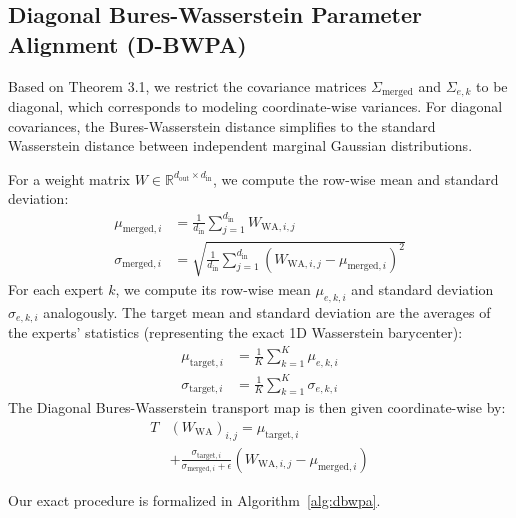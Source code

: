 \documentclass{article}
\theoremstyle{plain}
\theoremstyle{definition}
\theoremstyle{remark}
\begin{document}
\subsection{Diagonal Bures-Wasserstein Parameter Alignment (D-BWPA)}
Based on Theorem 3.1, we restrict the covariance matrices $\Sigma_{\text{merged}}$ and $\Sigma_{e, k}$ to be diagonal, which corresponds to modeling coordinate-wise variances. For diagonal covariances, the Bures-Wasserstein distance simplifies to the standard Wasserstein distance between independent marginal Gaussian distributions.

For a weight matrix $W \in \mathbb{R}^{d_{\text{out}} \times d_{\text{in}}}$, we compute the row-wise mean and standard deviation:
\begin{align}
  \mu_{\text{merged}, i} &= \frac{1}{d_{\text{in}}} \sum_{j=1}^{d_{\text{in}}} W_{\text{WA}, i, j} \\
  \sigma_{\text{merged}, i} &= \sqrt{\frac{1}{d_{\text{in}}} \sum_{j=1}^{d_{\text{in}}} (W_{\text{WA}, i, j} - \mu_{\text{merged}, i})^2}
\end{align}
For each expert $k$, we compute its row-wise mean $\mu_{e, k, i}$ and standard deviation $\sigma_{e, k, i}$ analogously. The target mean and standard deviation are the averages of the experts' statistics (representing the exact 1D Wasserstein barycenter):
\begin{align}
  \mu_{\text{target}, i} &= \frac{1}{K} \sum_{k=1}^K \mu_{e, k, i} \\
  \sigma_{\text{target}, i} &= \frac{1}{K} \sum_{k=1}^K \sigma_{e, k, i}
\end{align}
The Diagonal Bures-Wasserstein transport map is then given coordinate-wise by:
\begin{equation}
\begin{split}
  T&(W_{\text{WA}})_{i, j} = \mu_{\text{target}, i} \\
  &+ \frac{\sigma_{\text{target}, i}}{\sigma_{\text{merged}, i} + \epsilon} (W_{\text{WA}, i, j} - \mu_{\text{merged}, i})
\end{split}
\end{equation}

Our exact procedure is formalized in Algorithm~\ref{alg:dbwpa}.
\end{document}

